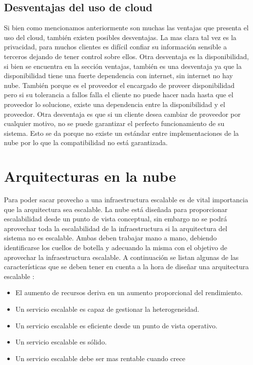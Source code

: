     \subsection {Desventajas del uso de cloud}
    Si bien como mencionamos anteriormente son muchas las ventajas que presenta el uso del cloud, también existen posibles desventajas. 
    La mas clara tal vez es la privacidad, para muchos clientes es difícil confiar su información sensible a terceros dejando de tener control sobre ellos. 
    Otra desventaja es la disponibilidad, si bien se encuentra en la sección ventajas, también es una desventaja ya que la disponibilidad tiene una fuerte dependencia con internet, sin internet no hay nube. También porque es el proveedor el encargado de proveer disponibilidad pero si su tolerancia a fallos falla el cliente no puede hacer nada hasta que el proveedor lo solucione, existe una dependencia entre la disponibilidad y el proveedor. 
    Otra desventaja es que si un cliente desea cambiar de proveedor por cualquier motivo, no se puede garantizar el perfecto funcionamiento de su sistema. Esto se da porque no existe un estándar entre implementaciones de la nube por lo que la compatibilidad no está garantizada.
    
 \section{Arquitecturas en la nube}
 Para poder sacar provecho a una infraestructura escalable es de vital importancia que la arquitectura sea escalable. La nube está diseñada para proporcionar escalabilidad desde un punto de vista conceptual, sin embargo no se podrá aprovechar toda la escalabilidad de la infraestructura si la arquitectura del sistema no es escalable. Ambas deben trabajar mano a mano, debiendo identificarse los cuellos de botella y adecuando la misma con el objetivo de aprovechar la infraestructura escalable. A continuación se listan algunas de las características que se deben tener en cuenta a la hora de diseñar una arquitectura escalable : 
 
 \begin{itemize}
 \item El aumento de recursos deriva en un aumento proporcional del rendimiento.
 \item Un servicio escalable es capaz de gestionar la heterogeneidad.
 \item Un servicio escalable es eficiente desde un punto de vista operativo.
 \item Un servicio escalable es sólido.
 \item Un servicio escalable debe ser mas rentable cuando crece
 \end {itemize}
 

